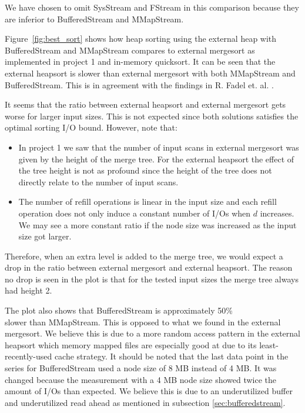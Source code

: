 We have chosen to omit SysStream and FStream in this comparison because they are inferior to BufferedStream and MMapStream.

Figure~\ref{fig:best_sort} shows how heap sorting using the external heap with BufferedStream and MMapStream compares to external mergesort as implemented in project 1 and in-memory quicksort. It can be seen that the external heapsort is slower than external mergesort with both MMapStream and BufferedStream. This is in agreement with the findings in R. Fadel et. al. \citep{Fadel1999345}.

It seems that the ratio between external heapsort and external mergesort gets worse for larger input sizes. This is not expected since both solutions satisfies the optimal sorting I/O bound. However, note that:
\begin{itemize}
\item In project 1 we saw that the number of input scans in external mergesort was given by the height of the merge tree. For the external heapsort the effect of the tree height is not as profound since the height of the tree does not directly relate to the number of input scans.
\item The number of refill operations is linear in the input size and each refill operation does not only induce a constant number of I/Os when $d$ increases. We may see a more constant ratio if the node size was increased as the input size got larger.
\end{itemize}
Therefore, when an extra level is added to the merge tree, we would expect a drop in the ratio between external mergesort and external heapsort. The reason no drop is seen in the plot is that for the tested input sizes the merge tree always had height 2.

The plot also shows that BufferedStream is approximately 50\% \\ slower than MMapStream. This is opposed to what we found in the external mergesort. We believe this is due to a more random access pattern in the external heapsort which memory mapped files are especially good at due to its least-recently-used cache strategy. It should be noted that the last data point in the series for BufferedStream used a node size of 8 MB instead of 4 MB. It was changed because the measurement with a 4 MB node size showed twice the amount of I/Os than expected. We believe this is due to an underutilized buffer and underutilized read ahead as mentioned in subsection \ref{sec:bufferedstream}.
